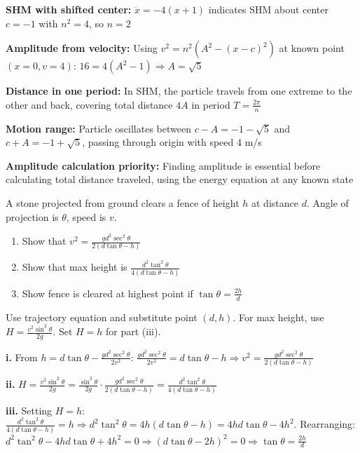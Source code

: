 \begin{takeaways}
\item \textbf{SHM with shifted center:} $\ddot{x} = -4(x+1)$ indicates SHM about center $c = -1$ with $n^2 = 4$, so $n = 2$
\item \textbf{Amplitude from velocity:} Using $v^2 = n^2(A^2 - (x-c)^2)$ at known point $(x=0, v=4)$: $16 = 4(A^2 - 1) \Rightarrow A = \sqrt{5}$
\item \textbf{Distance in one period:} In SHM, the particle travels from one extreme to the other and back, covering total distance $4A$ in period $T = \frac{2\pi}{n}$
\item \textbf{Motion range:} Particle oscillates between $c-A = -1-\sqrt{5}$ and $c+A = -1+\sqrt{5}$, passing through origin with speed 4 m/s
\item \textbf{Amplitude calculation priority:} Finding amplitude is essential before calculating total distance traveled, using the energy equation at any known state
\end{takeaways}

\begin{problem}
A stone projected from ground clears a fence of height $h$ at distance $d$. Angle of projection is $\theta$, speed is $v$.

\begin{enumerate}[label=\textbf{\roman*.}]
    \item Show that $v^2 = \frac{gd^2\sec^2\theta}{2(d\tan\theta - h)}$
    \item Show that max height is $\frac{d^2\tan^2\theta}{4(d\tan\theta - h)}$
    \item Show fence is cleared at highest point if $\tan\theta = \frac{2h}{d}$
\end{enumerate}
\end{problem}

\begin{hint}
Use trajectory equation and substitute point $(d, h)$. For max height, use $H = \frac{v^2\sin^2\theta}{2g}$. Set $H = h$ for part (iii).
\end{hint}

\begin{solution}
\textbf{i.} From $h = d\tan\theta - \frac{gd^2\sec^2\theta}{2v^2}$: $\frac{gd^2\sec^2\theta}{2v^2} = d\tan\theta - h \Rightarrow v^2 = \frac{gd^2\sec^2\theta}{2(d\tan\theta-h)}$ 

\textbf{ii.} $H = \frac{v^2\sin^2\theta}{2g} = \frac{\sin^2\theta}{2g} \cdot \frac{gd^2\sec^2\theta}{2(d\tan\theta-h)} = \frac{d^2\tan^2\theta}{4(d\tan\theta-h)}$ 

\textbf{iii.} Setting $H = h$: $\frac{d^2\tan^2\theta}{4(d\tan\theta-h)} = h \Rightarrow d^2\tan^2\theta = 4h(d\tan\theta-h) = 4hd\tan\theta - 4h^2$. Rearranging: $d^2\tan^2\theta - 4hd\tan\theta + 4h^2 = 0 \Rightarrow (d\tan\theta - 2h)^2 = 0 \Rightarrow \tan\theta = \frac{2h}{d}$ 
\end{solution}


